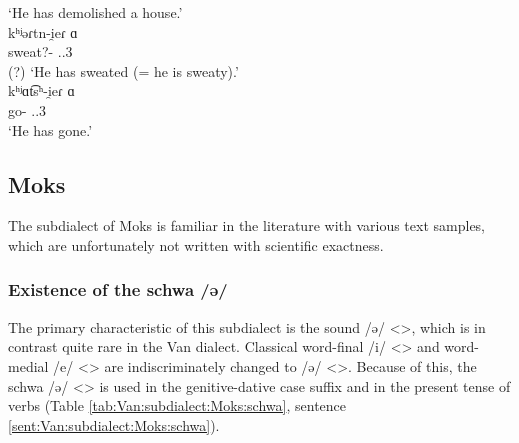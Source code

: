 \begin{exe}
\begin{xlist}
		\trans `He has demolished a house.'\\ 
		\ex \gll kʰʲəɾtn-i̯eɾ ɑ \\
		sweat?-{\perfcvb} {\aux}.{\prs}.3{\sg} \\
		\trans  (?)  `He has sweated (= he is sweaty).'\\ 
		\ex \gll kʰʲɑt͡sʰ-i̯eɾ ɑ \\
		go-{\perfcvb} {\aux}.{\prs}.3{\sg} \\
		\trans `He has gone.'\\ 
	\end{xlist}
\end{exe}

\subsection{Moks}

The subdialect of Moks is familiar in the literature with various text samples, which are unfortunately not written with scientific exactness. 


\begin{adjarianpage}\label{page:147}\end{adjarianpage}%

\subsubsection{Existence of the schwa /ə/}
The primary characteristic of this subdialect is the sound /ə/ <>, which is in contrast quite rare in the Van dialect. Classical word-final /i/ <> and word-medial /e/ <> are indiscriminately changed to /ə/ <>. Because of this, the schwa /ə/ <> is used in the genitive-dative case suffix and in the present tense of verbs (Table \ref{tab:Van:subdialect:Moks:schwa}, sentence \ref{sent:Van:subdialect:Moks:schwa}).

